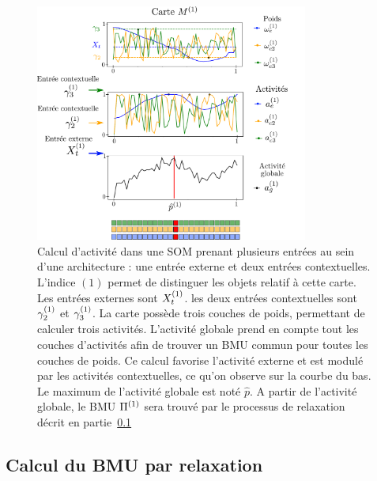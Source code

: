 \begin{figure}
\centering
\includegraphics[width=0.8\textwidth]{activite_layers.pdf}
\caption{Calcul d'activité dans une SOM prenant plusieurs entrées au sein d'une architecture : une entrée externe et deux entrées contextuelles. L'indice $(1)$ permet de distinguer les objets relatif à cette carte. Les entrées externes sont $X^{({1})}_t$. les deux entrées contextuelles sont $\gamma^{({1})}_2$ et $\gamma^{({1})}_3$. La carte possède trois couches de poids, permettant de calculer trois activités. L'activité globale prend en compte tout les couches d'activités afin de trouver un BMU commun pour toutes les couches de poids. Ce calcul favorise l'activité externe et est modulé par les activités contextuelles, ce qu'on observe sur la courbe du bas. Le maximum de l'activité globale est noté $\hat{p}$. A partir de l'activité globale, le BMU $\Pi^{({1})}$ sera trouvé par le processus de relaxation décrit en partie~\ref{sec:relax}}
\label{fig:activite}
\end{figure}

\subsection{Calcul du BMU par relaxation}\label{sec:relax}

